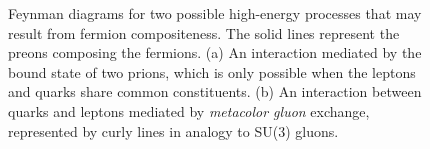 \begin{figure}[h!]
\captionsetup[subfigure]{position=b}
\centering
\hspace{0.15\textwidth}%
\caption{Feynman diagrams for two possible high-energy processes that may result from fermion compositeness. The solid lines represent the preons composing the fermions. (a) An interaction mediated by the bound state of two prions, which is only possible when the leptons and quarks share common constituents. (b) An interaction between quarks and leptons mediated by \emph{metacolor gluon} exchange, represented by curly lines in analogy to SU(3) gluons.}
\label{fig:ciBlobs}
\end{figure}

